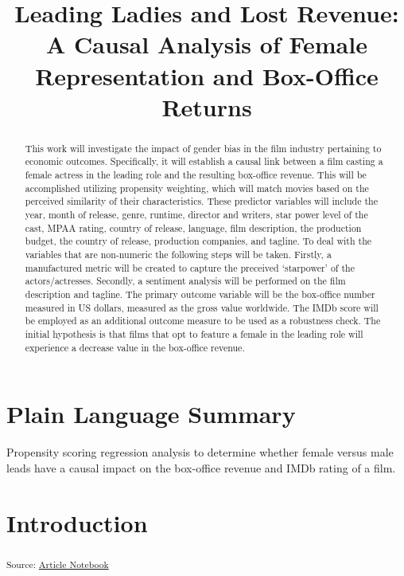 \documentclass[
]{agujournal2019}
\begin{document}
\title{Leading Ladies and Lost Revenue: A Causal Analysis of Female
Representation and Box-Office Returns}



\begin{abstract}
This work will investigate the impact of gender bias in the film
industry pertaining to economic outcomes. Specifically, it will
establish a causal link between a film casting a female actress in the
leading role and the resulting box-office revenue. This will be
accomplished utilizing propensity weighting, which will match movies
based on the perceived similarity of their characteristics. These
predictor variables will include the year, month of release, genre,
runtime, director and writers, star power level of the cast, MPAA
rating, country of release, language, film description, the production
budget, the country of release, production companies, and tagline. To
deal with the variables that are non-numeric the following steps will be
taken. Firstly, a manufactured metric will be created to capture the
preceived `starpower' of the actors/actresses. Secondly, a sentiment
analysis will be performed on the film description and tagline. The
primary outcome variable will be the box-office number measured in US
dollars, measured as the gross value worldwide. The IMDb score will be
employed as an additional outcome measure to be used as a robustness
check. The initial hypothesis is that films that opt to feature a female
in the leading role will experience a decrease value in the box-office
revenue.
\end{abstract}

\section*{Plain Language Summary}
Propensity scoring regression analysis to determine whether female
versus male leads have a causal impact on the box-office revenue and
IMDb rating of a film.




\section{Introduction}\label{introduction}

\textsubscript{Source:
\href{https://ehealy19.github.io/Matching_Movies/index.qmd.html}{Article
Notebook}}
\end{document}
